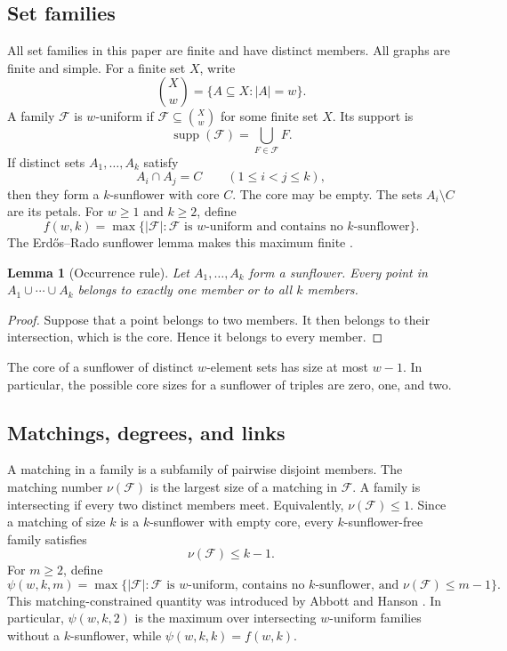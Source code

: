 \documentclass[11pt]{article}
\numberwithin{equation}{section}
\newtheorem{lemma}[lemma]{Lemma}
\theoremstyle{definition}
\theoremstyle{remark}
\newcommand{\F}{\mathcal F}
\newcommand{\supp}{\operatorname{supp}}
\begin{document}
\subsection{Set families}

All set families in this paper are finite and have distinct members. All
graphs are finite and simple. For a finite set $X$, write
\[
 \binom{X}{w}=\{A\subseteq X:|A|=w\}.
\]
A family $\F$ is $w$-uniform if $\F\subseteq\binom{X}{w}$ for some finite
set $X$. Its support is
\[
 \supp(\F)=\bigcup_{F\in\F}F.
\]
If distinct sets $A_1,\ldots,A_k$ satisfy
\[
 A_i\cap A_j=C\qquad(1\le i<j\le k),
\]
then they form a $k$-sunflower with core $C$. The core may be empty. The
sets $A_i\setminus C$ are its petals. For $w\ge1$ and $k\ge2$, define
\begin{equation}
 f(w,k)=\max\bigl\{|\F|:\F\text{ is $w$-uniform and contains no
 $k$-sunflower}\bigr\}.
 \label{eq:f-definition}
\end{equation}
The Erd\H{o}s--Rado sunflower lemma makes this maximum finite
\cite{ErdosRado1960}.

\begin{lemma}[Occurrence rule]
\label{lem:occurrence}
Let $A_1,\ldots,A_k$ form a sunflower. Every point in
$A_1\cup\cdots\cup A_k$ belongs to exactly one member or to all $k$ members.
\end{lemma}

\begin{proof}
Suppose that a point belongs to two members. It then belongs to their
intersection, which is the core. Hence it belongs to every member.
\end{proof}

The core of a sunflower of distinct $w$-element sets has size at most $w-1$.
In particular, the possible core sizes for a sunflower of triples are zero,
one, and two.

\subsection{Matchings, degrees, and links}

A matching in a family is a subfamily of pairwise disjoint members. The
matching number $\nu(\F)$ is the largest size of a matching in $\F$. A family
is intersecting if every two distinct members meet. Equivalently,
$\nu(\F)\le1$. Since a matching of size $k$ is a $k$-sunflower with empty
core, every $k$-sunflower-free family satisfies
\begin{equation}
 \nu(\F)\le k-1.
 \label{eq:matching-cap}
\end{equation}
For $m\ge2$, define
\begin{equation}
 \psi(w,k,m)=\max\bigl\{|\F|:\F\text{ is $w$-uniform, contains no
 $k$-sunflower, and }\nu(\F)\le m-1\bigr\}.
 \label{eq:psi-definition}
\end{equation}
This matching-constrained quantity was introduced by Abbott and Hanson
\cite{AbbottHanson1974}.
In particular, $\psi(w,k,2)$ is the maximum over intersecting $w$-uniform
families without a $k$-sunflower, while $\psi(w,k,k)=f(w,k)$.
\end{document}
